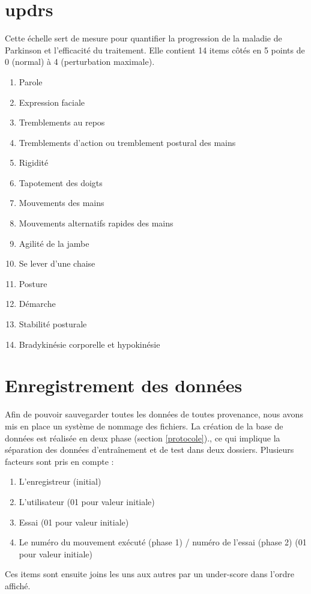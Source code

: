 \documentclass{article}
\begin{document}
\section{\acrlong{updrs}}

Cette échelle sert de mesure pour quantifier la progression de la maladie de Parkinson et l'efficacité du traitement. Elle contient 14 items côtés en 5 points de 0 (normal) à 4 (perturbation maximale). 

\begin{enumerate}
	\item Parole
	\item Expression faciale
	\item Tremblements au repos
	\item Tremblements d'action ou tremblement postural des mains
	\item Rigidité
	\item Tapotement des doigts 
	\item Mouvements des mains 
	\item Mouvements alternatifs rapides des mains
	\item Agilité de la jambe
	\item Se lever d'une chaise
	\item Posture
	\item Démarche
	\item Stabilité posturale
	\item Bradykinésie corporelle et hypokinésie
\end{enumerate}

\section{Enregistrement des données}
\label{nommage_data}

Afin de pouvoir sauvegarder toutes les données de toutes provenance, nous avons mis en place un système de nommage des fichiers. La création de la base de données est réalisée en deux phase (section \ref{protocole})., ce qui implique la séparation des données d'entraînement et de test dans deux dossiers. Plusieurs facteurs sont pris en compte :
\begin{enumerate}
	\item L'enregistreur (initial)
	\item L'utilisateur (01 pour valeur initiale)
	\item Essai (01 pour valeur initiale)
	\item Le numéro du mouvement exécuté (phase 1) / numéro de l'essai (phase 2) (01 pour valeur initiale) 
\end{enumerate}
Ces items sont ensuite joins les uns aux autres par un under-score dans l'ordre affiché.
\end{document}
